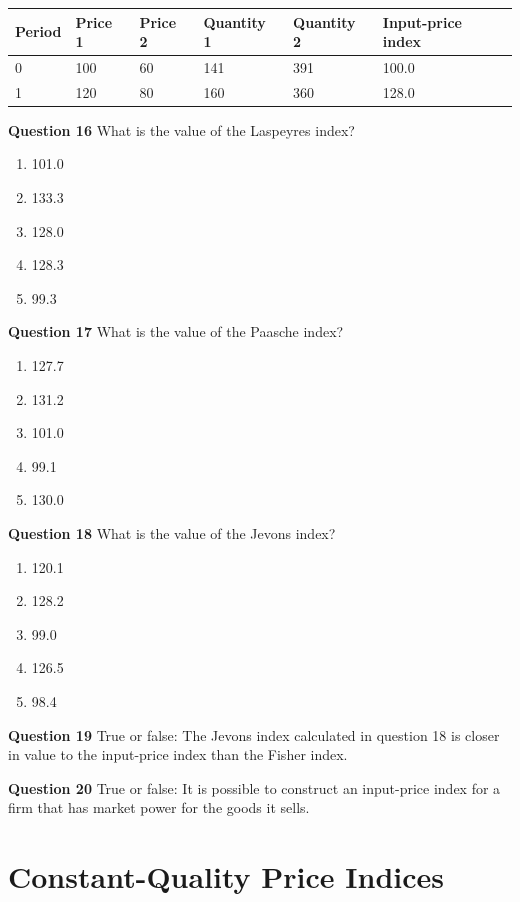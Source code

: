 \documentclass[
]{article}
\begin{document}
\begin{longtable}[]{@{}llllll@{}}
\toprule
Period & Price 1 & Price 2 & Quantity 1 & Quantity 2 & Input-price index \\
\midrule
\endhead
0 & 100 & 60 & 141 & 391 & 100.0 \\
1 & 120 & 80 & 160 & 360 & 128.0 \\
\bottomrule
\end{longtable}

\textbf{Question 16} What is the value of the Laspeyres index?

\begin{enumerate}
\def\labelenumi{\alph{enumi})}
\item
  101.0
\item
  133.3
\item
  128.0
\item
  128.3
\item
  99.3
\end{enumerate}

\textbf{Question 17} What is the value of the Paasche index?

\begin{enumerate}
\def\labelenumi{\alph{enumi})}
\item
  127.7
\item
  131.2
\item
  101.0
\item
  99.1
\item
  130.0
\end{enumerate}

\textbf{Question 18} What is the value of the Jevons index?

\begin{enumerate}
\def\labelenumi{\alph{enumi})}
\item
  120.1
\item
  128.2
\item
  99.0
\item
  126.5
\item
  98.4
\end{enumerate}

\textbf{Question 19} True or false: The Jevons index calculated in question 18 is closer in value to the input-price index than the Fisher index.

\textbf{Question 20} True or false: It is possible to construct an input-price index for a firm that has market power for the goods it sells.

\hypertarget{part-constant-quality-price-indices}{%
\part{Constant-Quality Price Indices}\label{part-constant-quality-price-indices}}
\end{document}
